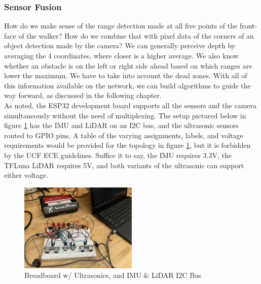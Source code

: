 \subsubsection{Sensor Fusion}
\noindent How do we make sense of the range detection made at all five points of the front-face of the walker? How do we combine that with pixel data of the corners of an object detection made by the camera? We can generally perceive depth by averaging the 4 coordinates, where closer is a higher average. We also know whether an obstacle is on the left or right side ahead based on which ranges are lower the maximum. We have to take into account the dead zones. With all of this information available on the network, we can build algorithms to guide the way forward, as discussed in the following chapter.\\

\noindent As noted, the ESP32 development board supports all the sensors and the camera simultaneously without the need of multiplexing. The setup pictured below in figure \ref{fig:bb-test} has the IMU and LiDAR on an I2C bus, and the ultrasonic sensors routed to GPIO pins. A table of the varying assignments, labels, and voltage requirements would be provided for the topology in figure \ref{fig:bb-test}, but it is forbidden by the UCF ECE guidelines. Suffice it to say, the IMU requires 3.3V, the TFLuna LiDAR requires 5V, and both variants of the ultrasonic can support either voltage.\\
\begin{figure}[H]
	\centering
	\includegraphics[width=0.5\textwidth]{./Images/breadboard-test.jpg}
	\caption{\label{fig:bb-test}Breadboard w/ Ultrasonics, and IMU \& LiDAR I2C Bus}
\end{figure}
